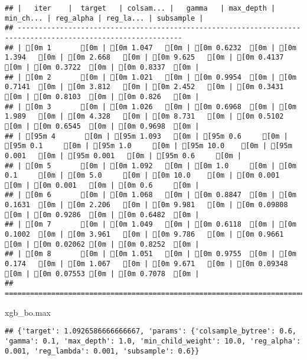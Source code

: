 \documentclass[]{article}
\newenvironment{Shaded}{\begin{snugshade}}{\end{snugshade}}
\newcommand{\BuiltInTok}[1]{#1}
\newcommand{\NormalTok}[1]{#1}
\begin{document}
\begin{verbatim}
## |   iter    |  target   | colsam... |   gamma   | max_depth | min_ch... | reg_alpha | reg_la... | subsample |
## -------------------------------------------------------------------------------------------------------------
## | [0m 1       [0m | [0m 1.047   [0m | [0m 0.6232  [0m | [0m 1.394   [0m | [0m 2.668   [0m | [0m 9.625   [0m | [0m 0.4137  [0m | [0m 0.3722  [0m | [0m 0.8337  [0m |
## | [0m 2       [0m | [0m 1.021   [0m | [0m 0.9954  [0m | [0m 0.7141  [0m | [0m 3.812   [0m | [0m 2.452   [0m | [0m 0.3431  [0m | [0m 0.8103  [0m | [0m 0.826   [0m |
## | [0m 3       [0m | [0m 1.026   [0m | [0m 0.6968  [0m | [0m 1.989   [0m | [0m 4.328   [0m | [0m 8.731   [0m | [0m 0.5102  [0m | [0m 0.6545  [0m | [0m 0.9698  [0m |
## | [95m 4       [0m | [95m 1.093   [0m | [95m 0.6     [0m | [95m 0.1     [0m | [95m 1.0     [0m | [95m 10.0    [0m | [95m 0.001   [0m | [95m 0.001   [0m | [95m 0.6     [0m |
## | [0m 5       [0m | [0m 1.092   [0m | [0m 1.0     [0m | [0m 0.1     [0m | [0m 5.0     [0m | [0m 10.0    [0m | [0m 0.001   [0m | [0m 0.001   [0m | [0m 0.6     [0m |
## | [0m 6       [0m | [0m 1.068   [0m | [0m 0.8847  [0m | [0m 0.1631  [0m | [0m 2.206   [0m | [0m 9.981   [0m | [0m 0.09808 [0m | [0m 0.9286  [0m | [0m 0.6482  [0m |
## | [0m 7       [0m | [0m 1.049   [0m | [0m 0.6118  [0m | [0m 0.1002  [0m | [0m 3.961   [0m | [0m 9.786   [0m | [0m 0.9661  [0m | [0m 0.02062 [0m | [0m 0.8252  [0m |
## | [0m 8       [0m | [0m 1.051   [0m | [0m 0.9755  [0m | [0m 0.174   [0m | [0m 1.067   [0m | [0m 9.671   [0m | [0m 0.09348 [0m | [0m 0.07553 [0m | [0m 0.7078  [0m |
## =============================================================================================================
\end{verbatim}

\begin{Shaded}
\begin{Highlighting}[]
\NormalTok{xgb_bo.}\BuiltInTok{max}
\end{Highlighting}
\end{Shaded}

\begin{verbatim}
## {'target': 1.0926586666666667, 'params': {'colsample_bytree': 0.6, 'gamma': 0.1, 'max_depth': 1.0, 'min_child_weight': 10.0, 'reg_alpha': 0.001, 'reg_lambda': 0.001, 'subsample': 0.6}}
\end{verbatim}
\end{document}
